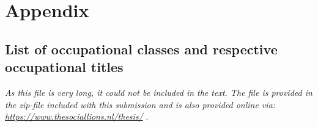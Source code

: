 \documentclass[
10pt, %
a4paper, %
oneside, %
headinclude,footinclude, %
] {book}%
\begin{document}

 



\newpage
\appendix
\chapter{Appendix}
\section{List of occupational classes and respective occupational titles}
\textit{As this file is very long, it could not be included in the text. The file is provided in the zip-file included with this submission and is also provided online via: \\ \url{https://www.thesociallions.nl/thesis/} }.

\newpage
\end{document}

